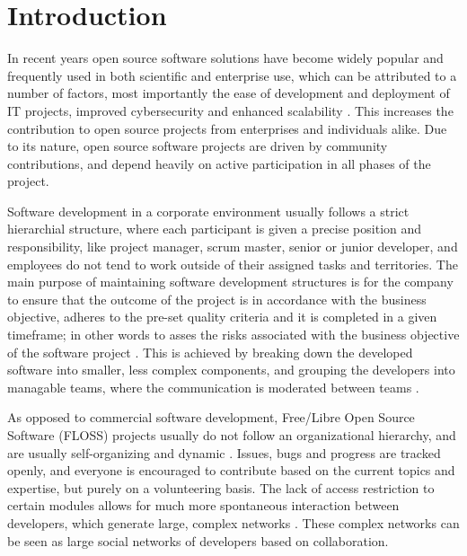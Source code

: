 \thepage
\section{Introduction}


In recent years open source software solutions have become widely popular and frequently used in both scientific and enterprise use, which can be attributed to a number of factors, most importantly the ease of development and deployment of IT projects, improved cybersecurity and enhanced scalability \cite{pwcLeadingBenefitsOpensource2016}. This increases the contribution to open source projects from enterprises and individuals alike. Due to its nature, open source software projects are driven by community contributions, and depend heavily on active participation in all phases of the project.

Software development in a corporate environment usually follows a strict hierarchial structure, where each participant is given a precise position and responsibility, like project manager, scrum master, senior or junior developer, and employees do not tend to work outside of their assigned tasks and territories. The main purpose of maintaining software development structures is for the company to ensure that the outcome of the project is in accordance with the business objective, adheres to the pre-set quality criteria and it is completed in a given timeframe; in other words to asses the risks associated with the business objective of the software project \cite{surekaUsingSocialNetwork2011}. This is achieved by breaking down the developed software into smaller, less complex components, and grouping the developers into managable teams, where the communication is moderated between teams \cite{birdLatentSocialStructure2008}.

As opposed to commercial software development, Free/Libre Open Source Software (FLOSS) projects usually do not follow an organizational hierarchy, and are usually self-organizing and dynamic \cite{birdLatentSocialStructure2008}. Issues, bugs and progress are tracked openly, and everyone is encouraged to contribute based on the current topics and expertise, but purely on a volunteering basis. The lack of access restriction to certain modules allows for much more spontaneous interaction between developers, which generate large, complex networks \cite{martinez-romoUsingSocialNetwork2008}. These complex networks can be seen as large social networks of developers based on collaboration.

